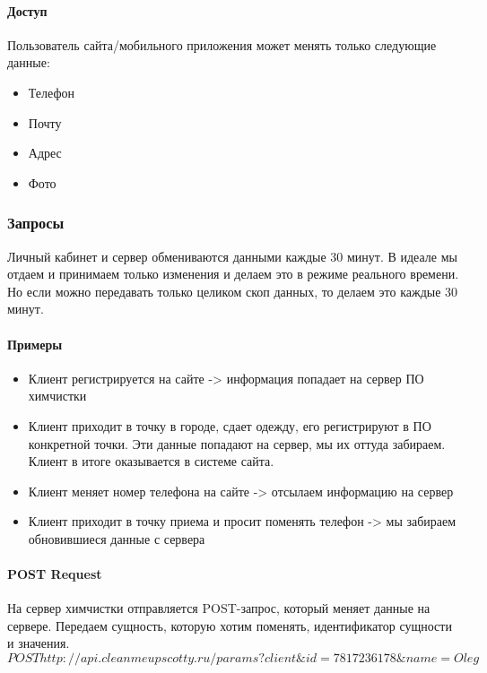 \documentclass[DIV=calc, paper=a4, fontsize=11pt]{scrartcl} %
\begin{document}
\paragraph{Доступ}
Пользователь сайта/мобильного приложения может менять только следующие данные:

\begin{itemize}
	\item Телефон
	\item Почту
	\item Адрес
	\item Фото
\end{itemize}

\subsubsection{Запросы}
Личный кабинет и сервер обмениваются данными каждые 30 минут. В идеале мы отдаем и принимаем только изменения и делаем это в режиме реального времени. Но если можно передавать только целиком скоп данных, то делаем это каждые 30 минут.
\paragraph{Примеры}
\begin{itemize}
	\item Клиент регистрируется на сайте -> информация попадает на сервер ПО химчистки
	\item Клиент приходит в точку в городе, сдает одежду, его регистрируют в ПО конкретной точки. Эти данные попадают на сервер, мы их оттуда забираем. Клиент в итоге оказывается в системе сайта.
	\item Клиент меняет номер телефона на сайте -> отсылаем информацию на сервер
	\item Клиент приходит в точку приема и просит поменять телефон -> мы забираем обновившиеся данные с сервера
\end{itemize}


\paragraph{POST Request}
На сервер химчистки отправляется POST-запрос, который меняет данные на сервере. Передаем сущность, которую хотим поменять, идентификатор сущности и значения.
\begin{displaymath}
	POST http://api.cleanmeupscotty.ru/params?client\&id=7817236178\&name=Oleg
\end{displaymath}	
\end{document}
